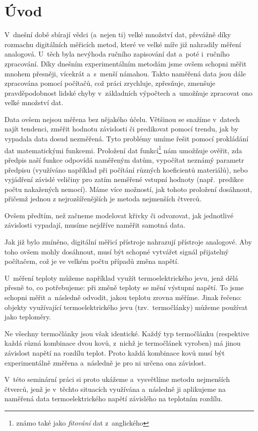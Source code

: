 \section{Úvod}
V~dnešní době sbírají vědci (a~nejen ti) velké množství dat, převážně díky
rozmachu digitálních měřicích metod, které ve velké míře již nahradily měření
analogová. U~těch byla nevýhoda ručního zapisování dat a~poté i~ručního
zpracování. Díky dnešním experimentálním metodám jsme ovšem schopni měřit
mnohem přesněji, vícekrát a~s~menší námahou. Takto naměřená data jsou dále
zpracována pomocí počítačů, což práci zrychluje, zpřesňuje, zmenšuje
pravděpodobnost lidské chyby v~základních výpočtech a~umožňuje zpracovat ono
velké množství dat.

Data ovšem nejsou měřena bez nějakého účelu. Většinou se snažíme v~datech najít
tendenci, změřit hodnotu závislosti či predikovat pomocí trendu, jak by
vypadala data dosud nezměřená. Tyto problémy umíme řešit pomocí prokládání dat
matematickými funkcemi. Proložení dat funkcí\footnote{známo také jako
\emph{fitování} dat z~anglického } nám umožňuje ověřit, zda předpis
naší funkce odpovídá naměřeným datům, vypočítat neznámý parametr předpisu
(využíváno například při počítání různých koeficientů materiálů), nebo
vyjádření závislé veličiny pro zatím neměřené vstupní hodnoty (např.~predikce
počtu nakažených nemocí). Máme více možností, jak tohoto proložení dosáhnout,
přičemž jednou z nejrozšířenějších je metoda nejmenších čtverců.


Ovšem předtím, než začneme modelovat křivky či odvozovat, jak jednotlivé
závislosti vypadají, musíme nejdříve naměřit samotná data. 

Jak již bylo zmíněno, digitální měřicí přístroje nahrazují přístroje analogové.
Aby toho ovšem mohly dosáhnout, musí být schopné vytvářet signál přijatelný
počítačem, což je ve velkém počtu případů změna napětí. 

U~měření teploty můžeme například využít termoelektrického jevu, jenž dělá
přesně to, co potřebujeme: při změně teploty se mění výstupní napětí. To jsme
schopni měřit a~následně odvodit, jakou teplotu zrovna měříme. Jinak řečeno:
objekty využívající termoelektrického jevu (tzv.~termočlánky) můžeme používat
jako teploměry.

Ne všechny termočlánky jsou však identické. Každý typ termočlánku (respektive
každá různá kombinace dvou kovů, z~nichž je termočlánek vyroben) má jinou
závislost napětí na rozdílu teplot. Proto každá kombinace kovů musí být
experimentálně změřena a~následně je pro ni určena ona závislost.

V~této seminární práci si proto ukážeme a~vysvětlíme metodu nejmenších čtverců,
jenž je v~těchto situacích využívána a~následně ji aplikujeme na naměřená data
termoelektrického napětí závislého na teplotním rozdílu.
